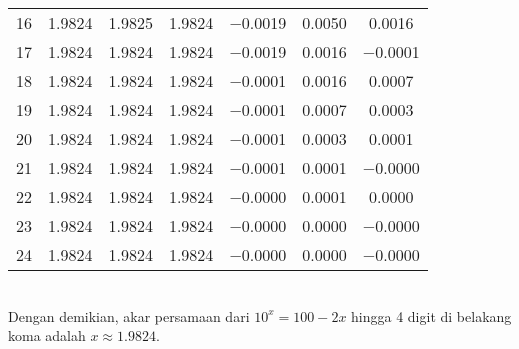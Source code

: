 \documentclass{article}
\begin{document}
\begin{enumerate}
\begin{enumerate}
\begin{tabular}{|c|c|c|c|c|c|c|}
            16 & \num{1,9824} & \num{1,9825} & \num{1,9824} & \num{-0,0019} & \num{0,0050} & \num{0,0016}\\
            17 & \num{1,9824} & \num{1,9824} & \num{1,9824} & \num{-0,0019} & \num{0,0016} & \num{-0,0001}\\
            18 & \num{1,9824} & \num{1,9824} & \num{1,9824} & \num{-0,0001} & \num{0,0016} & \num{0,0007}\\
            19 & \num{1,9824} & \num{1,9824} & \num{1,9824} & \num{-0,0001} & \num{0,0007} & \num{0,0003}\\
            20 & \num{1,9824} & \num{1,9824} & \num{1,9824} & \num{-0,0001} & \num{0,0003} & \num{0,0001}\\
            21 & \num{1,9824} & \num{1,9824} & \num{1,9824} & \num{-0,0001} & \num{0,0001} & \num{-0,0000}\\
            22 & \num{1,9824} & \num{1,9824} & \num{1,9824} & \num{-0,0000} & \num{0,0001} & \num{0,0000}\\
            23 & \num{1,9824} & \num{1,9824} & \num{1,9824} & \num{-0,0000} & \num{0,0000} & \num{-0,0000}\\
            24 & \num{1,9824} & \num{1,9824} & \num{1,9824} & \num{-0,0000} & \num{0,0000} & \num{-0,0000}\\
             \hline
            \end{tabular} \\           
        Dengan demikian, akar persamaan dari $10^x = 100 - 2x$ hingga 4 digit di belakang koma adalah $x \approx \num{1,9824}$.


\end{enumerate}
\end{enumerate}
\end{document}

